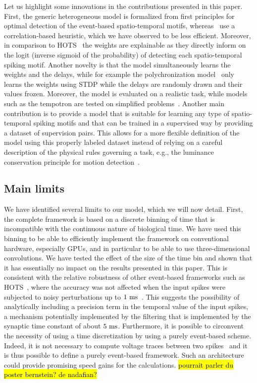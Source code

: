 \documentclass[default]{sn-jnl}%
\theoremstyle{thmstyleone}%
\theoremstyle{thmstyletwo}%
\theoremstyle{thmstylethree}%
\newcommand{\note}[1]{{\sethlcolor{yellow}\hl{#1}}}
\begin{document}
Let us highlight some innovations in the contributions presented in this paper. First, the generic heterogeneous model is formalized from first principles for optimal detection of the event-based spatio-temporal motifs, whereas~\citet{ghosh_spatiotemporal_2019,yu_stsc-snn_2022} use a correlation-based heuristic, which we have observed to be less efficient. Moreover, in comparison to HOTS~\citep{lagorce_hots_2017} the weights are explainable as they directly inform on the logit (inverse sigmoid of the probability) of detecting each spatio-temporal spiking motif. Another novelty is that the model simultaneously learns the weights and the delays, while for example the polychronization model~\citep{izhikevich_polychronization_2006} only learns the weights using STDP while the delays are randomly drawn and their values frozen. Moreover, the model is evaluated on a realistic task, while models such as the tempotron are tested on simplified problems~\citep{gutig_tempotron_2006}. Another main contribution is to provide a model that is suitable for learning any type of spatio-temporal spiking motifs and that can be trained in a supervised way by providing a dataset of supervision pairs. This allows for a more flexible definition of the model using this properly labeled dataset instead of relying on a careful description of the physical rules governing a task, e.g., the luminance conservation principle for motion detection~\citep{benosman_asynchronous_2012, dardelet_event-by-event_2021}.
%
\subsection{Main limits}
We have identified several limits to our model, which we will now detail. First, the complete framework is based on a discrete binning of time that is incompatible with the continuous nature of biological time. We have used this binning to be able to efficiently implement the framework on conventional hardware, especially GPUs, and in particular to be able to use three-dimensional convolutions. We have tested the effect of the size of the time bin and shown that it has essentially no impact on the results presented in this paper. This is consistent with the relative robustness of other event-based frameworks such as HOTS~\citep{lagorce_hots_2017}, where the accuracy was not affected when the input spikes were subjected to noisy perturbations up to $1~\si{\milli\second}$~\citep{grimaldi_robust_2022}. This suggests the possibility of analytically including a precision term in the temporal value of the input spikes, a mechanism potentially implemented by the filtering that is implemented by the synaptic time constant of about $5~\si{\milli\second}$. Furthermore, it is possible to circonvent the necessity of using a time discretization by using a purely event-based scheme. Indeed, it is not necessary to compute voltage traces between two spikes~\citep{hanuschkin_general_2010} and it is thus possible to define a purely event-based framework. Such an architecture could provide promising speed gains for the calculations.  \note{pourrait parler du poster bernstein? de nadafian?}
\end{document}
